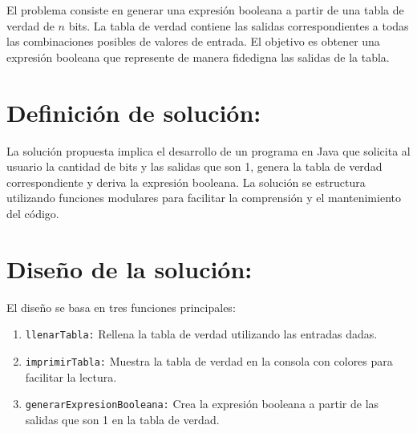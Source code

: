 \documentclass{IEEEcsmag}
\begin{document}
El problema consiste en generar una expresión booleana a partir de una tabla de verdad de \(n\) bits. La tabla de verdad contiene las salidas correspondientes a todas las combinaciones posibles de valores de entrada. El objetivo es obtener una expresión booleana que represente de manera fidedigna las salidas de la tabla.

\section*{Definición de solución:}

La solución propuesta implica el desarrollo de un programa en Java que solicita al usuario la cantidad de bits y las salidas que son 1, genera la tabla de verdad correspondiente y deriva la expresión booleana. La solución se estructura utilizando funciones modulares para facilitar la comprensión y el mantenimiento del código.

\section*{Diseño de la solución:}

El diseño se basa en tres funciones principales:
\begin{enumerate}
    \item \texttt{llenarTabla:} Rellena la tabla de verdad utilizando las entradas dadas.
    \item \texttt{imprimirTabla:} Muestra la tabla de verdad en la consola con colores para facilitar la lectura.
    \item \texttt{generarExpresionBooleana:} Crea la expresión booleana a partir de las salidas que son 1 en la tabla de verdad.
\end{enumerate}
\end{document}
